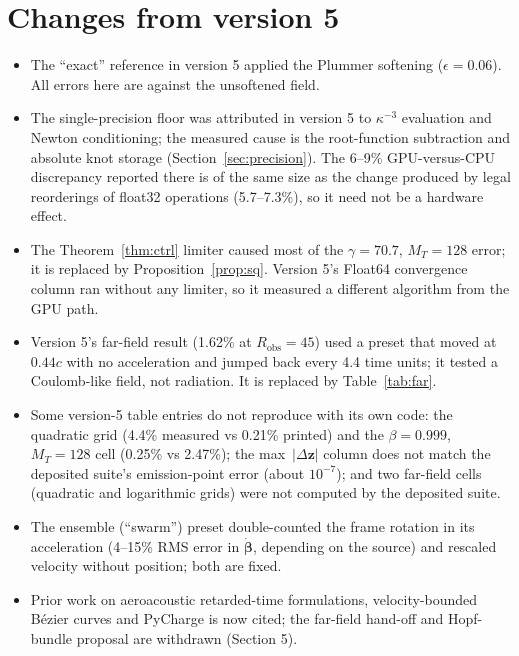 \documentclass[11pt, a4paper]{article}
\begin{document}
\section{Changes from version 5}\label{sec:changes}
\begin{itemize}
    \item The ``exact'' reference in version 5 applied the Plummer softening ($\epsilon = 0.06$). All errors here are against the unsoftened field.
    \item The single-precision floor was attributed in version 5 to $\kappa^{-3}$ evaluation and Newton conditioning; the measured cause is the root-function subtraction and absolute knot storage (Section~\ref{sec:precision}). The 6--9\% GPU-versus-CPU discrepancy reported there is of the same size as the change produced by legal reorderings of float32 operations (5.7--7.3\%), so it need not be a hardware effect.
    \item The Theorem~\ref{thm:ctrl} limiter caused most of the $\gamma = 70.7$, $M_T = 128$ error; it is replaced by Proposition~\ref{prop:sq}. Version 5's Float64 convergence column ran without any limiter, so it measured a different algorithm from the GPU path.
    \item Version 5's far-field result (1.62\% at $R_{\text{obs}} = 45$) used a preset that moved at $0.44c$ with no acceleration and jumped back every 4.4 time units; it tested a Coulomb-like field, not radiation. It is replaced by Table~\ref{tab:far}.
    \item Some version-5 table entries do not reproduce with its own code: the quadratic grid (4.4\% measured vs 0.21\% printed) and the $\beta = 0.999$, $M_T = 128$ cell (0.25\% vs 2.47\%); the max~$|\Delta\mathbf{z}|$ column does not match the deposited suite's emission-point error (about $10^{-7}$); and two far-field cells (quadratic and logarithmic grids) were not computed by the deposited suite.
    \item The ensemble (``swarm'') preset double-counted the frame rotation in its acceleration (4--15\% RMS error in $\dot{\boldsymbol{\beta}}$, depending on the source) and rescaled velocity without position; both are fixed.
    \item Prior work on aeroacoustic retarded-time formulations, velocity-bounded B\'ezier curves and PyCharge is now cited; the far-field hand-off and Hopf-bundle proposal are withdrawn (Section 5).
\end{itemize}
\end{document}
